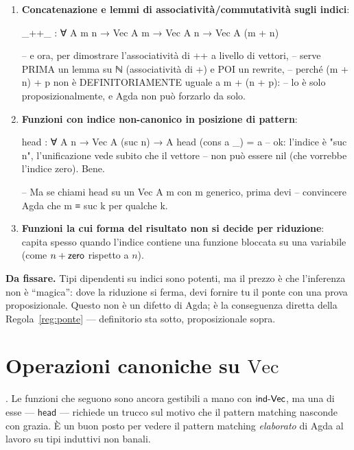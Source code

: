 \begin{enumerate}
\item \textbf{Concatenazione e lemmi di associativit\`a/commutativit\`a sugli indici}:
\begin{agda}
_++_ : ∀ {A m n} → Vec A m → Vec A n → Vec A (m + n)

-- e ora, per dimostrare l'associatività di ++ a livello di vettori,
-- serve PRIMA un lemma su ℕ (associatività di +) e POI un rewrite,
-- perché (m + n) + p non è DEFINITORIAMENTE uguale a m + (n + p):
-- lo è solo proposizionalmente, e Agda non può forzarlo da solo.
\end{agda}

\item \textbf{Funzioni con indice non-canonico in posizione di pattern}:
\begin{agda}
head : ∀ {A n} → Vec A (suc n) → A
head (cons a _) = a
-- ok: l'indice è "suc n", l'unificazione vede subito che il vettore
-- non può essere nil (che vorrebbe l'indice zero). Bene.

-- Ma se chiami head su un Vec A m con m generico, prima devi
-- convincere Agda che m ≡ suc k per qualche k.
\end{agda}

\item \textbf{Funzioni la cui forma del risultato non si decide per riduzione}: capita spesso quando l'indice contiene una funzione bloccata su una variabile (come $n + \mathsf{zero}$ rispetto a $n$).
\end{enumerate}

\noindent\textbf{Da fissare.} Tipi dipendenti su indici sono potenti, ma il prezzo \`e che l'inferenza non \`e ``magica'': dove la riduzione si ferma, devi fornire tu il ponte con una prova proposizionale. Questo non \`e un difetto di Agda; \`e la conseguenza diretta della Regola~\ref{reg:ponte} --- definitorio sta sotto, proposizionale sopra.

\section*{Operazioni canoniche su $\mathrm{Vec}$}\label{sec:notevoli-vec}

. Le funzioni che seguono sono ancora gestibili a mano con $\mathsf{ind\text{-}Vec}$, ma una di esse --- $\mathsf{head}$ --- richiede un trucco sul motivo che il pattern matching nasconde con grazia. \`E un buon posto per vedere il pattern matching \emph{elaborato} di Agda al lavoro su tipi induttivi non banali.

